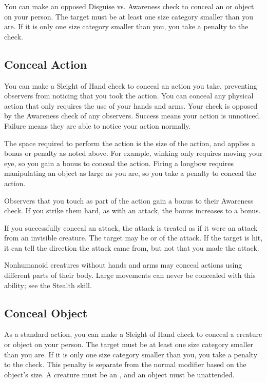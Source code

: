          You can make an opposed Disguise vs. Awareness check to conceal an  or  object on your person.
        The target must be at least one size category smaller than you are.
        If it is only one size category smaller than you, you take a  penalty to the check.

    \subsection{Conceal Action}
        You can make a Sleight of Hand check to conceal an action you take, preventing observers from noticing that you took the action. You can conceal any physical action that only requires the use of your hands and arms. Your check is opposed by the Awareness check of any observers. Success means your action is unnoticed. Failure means they are able to notice your action normally.

        The space required to perform the action is the size of the action, and applies a bonus or penalty as noted above. For example, winking only requires moving your eye, so you gain a  bonus to conceal the action. Firing a longbow requires manipulating an object as large as you are, so you take a  penalty to conceal the action.

        Observers that you touch as part of the action gain a  bonus to their Awareness check. If you strike them hard, as with an attack, the bonus increases to a  bonus.

        If you successfully conceal an attack, the attack is treated as if it were an attack from an invisible creature. The target may be \unaware or \partiallyunaware of the attack. If the target is hit, it can tell the direction the attack came from, but not that you made the attack.

        Nonhumanoid creatures without hands and arms may conceal actions using different parts of their body. Large movements can never be concealed with this ability; see the Stealth skill.

    \subsection{Conceal Object}
        As a standard action, you can make a Sleight of Hand check to conceal a creature or object on your person.
        The target must be at least one size category smaller than you are.
        If it is only one size category smaller than you, you take a  penalty to the check.
        This penalty is separate from the normal modifier based on the object's size.
        A creature must be an , and an object must be unattended.

